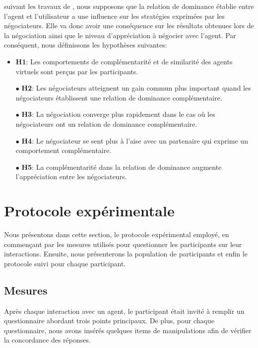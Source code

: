 	suivant les travaux de \cite{tiedens2003power,..}, nous supposons que la relation de dominance établie entre l'agent et l'utilisateur a une influence sur les stratégies exprimées par les négociateurs. Elle va donc avoir une conséquence sur les résultats obtenues lors de la négociation ainsi que le niveau d'appréciation à négocier avec l'agent.
	 Par conséquent, nous définissons les hypothèses suivantes: 
		\begin{itemize}
			\item\textbf{H1}: Les comportements de complémentarité et de similarité des agents virtuels sont perçus par les participants.
			\item [$\bullet$] \textbf{H2}: Les négociateurs atteignent un gain commun plus important quand les négociateurs établissent une relation de dominance complémentaire.
			\item [$\bullet$] \textbf{H3}: La négociation converge plus rapidement dans le cas où les négociateurs ont un relation de dominance complémentaire. 
			\item [$\bullet$] \textbf{H4}: Le négociateur se sent plus à l'aise avec un partenaire qui exprime un comportement complémentaire.
			\item [$\bullet$] \textbf{H5}: La complémentarité dans la relation de dominance augmente l'appréciation entre les négociateurs.
		\end{itemize}



\section{Protocole expérimentale}
\label{sec:procedure}
	Nous présentons dans cette section, le protocole expérimental employé, en commençant par les mesures utilisés pour questionner les participants sur leur interactions. Ensuite, nous présenterons la population de participants et enfin le protocole suivi pour chaque participant. 
	
	\subsection{Mesures}
		Après chaque interaction avec un agent, le participant était invité à remplir un questionnaire abordant trois points principaux. De plus, pour chaque questionnaire, nous avons insérés quelques items de manipulations afin de vérifier la concordance des réponses. 
		
